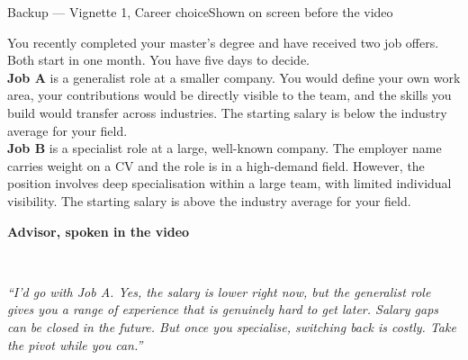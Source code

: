 \documentclass[aspectratio=169,10pt]{beamer}
\newcommand{\panelhead}[1]{\noindent\colorbox{kncyan}{\parbox{0.96\textwidth}{\centering\vspace{1pt}\color{white}\scriptsize\bfseries #1\vspace{1pt}}}\\[0.25em]}
\begin{document}
\begin{frame}{Backup — Vignette 1, Career choice}{Shown on screen before the video}
  \vspace{0.4em}
  \noindent\colorbox{knlight}{\parbox{0.975\textwidth}{\vspace{3pt}\scriptsize
  You recently completed your master's degree and have received two job offers. Both start in one month. You have five days to decide.\\[0.5em]
  \textbf{Job A} is a generalist role at a smaller company. You would define your own work area, your contributions would be directly visible to the team, and the skills you build would transfer across industries. The starting salary is below the industry average for your field.\\[0.5em]
  \textbf{Job B} is a specialist role at a large, well-known company. The employer name carries weight on a CV and the role is in a high-demand field. However, the position involves deep specialisation within a large team, with limited individual visibility. The starting salary is above the industry average for your field.\vspace{3pt}}}
  \vspace{0.8em}

  \panelhead{Advisor, spoken in the video}
  \noindent\colorbox{knpale}{\parbox{0.975\textwidth}{\vspace{3pt}\scriptsize\itshape
  ``I'd go with Job A. Yes, the salary is lower right now, but the generalist role gives you a range of experience that is genuinely hard to get later. Salary gaps can be closed in the future. But once you specialise, switching back is costly. Take the pivot while you can.''\vspace{3pt}}}
  \scriptlegend
\end{frame}
\end{document}
